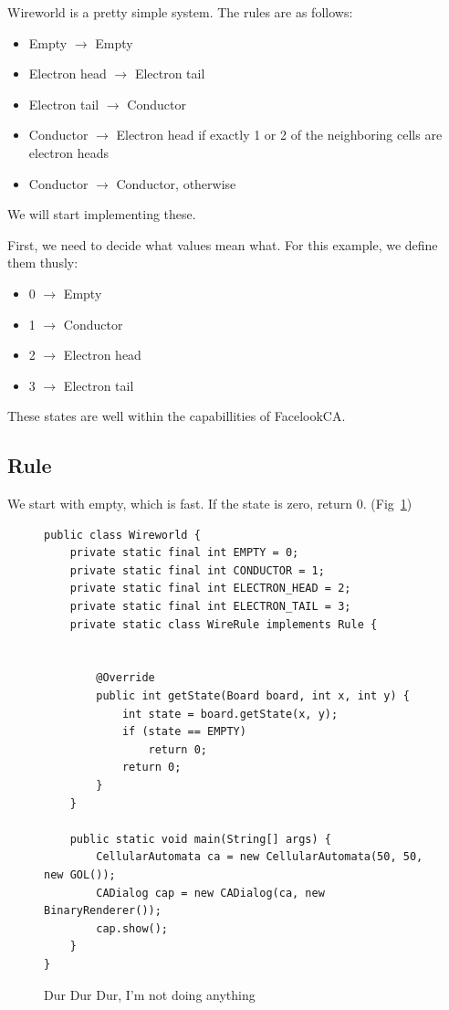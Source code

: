 \documentclass{report}
\begin{document}
Wireworld is a pretty simple system. The rules are as follows:
\begin{itemize}
  \item Empty $\rightarrow$ Empty
  \item Electron head $\rightarrow$ Electron tail
  \item Electron tail $\rightarrow$ Conductor
  \item Conductor $\rightarrow$ Electron head if exactly 1 or 2 of the
  neighboring cells are electron heads
  \item Conductor $\rightarrow$ Conductor, otherwise
\end{itemize}
We will start implementing these.


First, we need to decide what values mean what. For this example, we define them
thusly:
\begin{itemize} 
  \item 0 $\rightarrow$ Empty
  \item 1 $\rightarrow$ Conductor
  \item 2 $\rightarrow$ Electron head
  \item 3 $\rightarrow$ Electron tail
\end{itemize}
These states are well within the capabillities of FacelookCA.

\subsection{Rule}
We start with empty, which is fast. If the state is zero, return 0.
(Fig~\ref{code:empty}) 
\begin{figure}[H]
\begin{lstlisting}
public class Wireworld {
    private static final int EMPTY = 0;
    private static final int CONDUCTOR = 1;
    private static final int ELECTRON_HEAD = 2;
    private static final int ELECTRON_TAIL = 3;
	private static class WireRule implements Rule {


        @Override
        public int getState(Board board, int x, int y) {
            int state = board.getState(x, y);
            if (state == EMPTY)
                return 0;
            return 0; 
        }
    }
    
    public static void main(String[] args) {
        CellularAutomata ca = new CellularAutomata(50, 50, new GOL());
        CADialog cap = new CADialog(ca, new BinaryRenderer());
        cap.show();
    }
}
\end{lstlisting}
\caption{Dur Dur Dur, I'm not doing anything}
\label{code:empty}
\end{figure}
\end{document}
